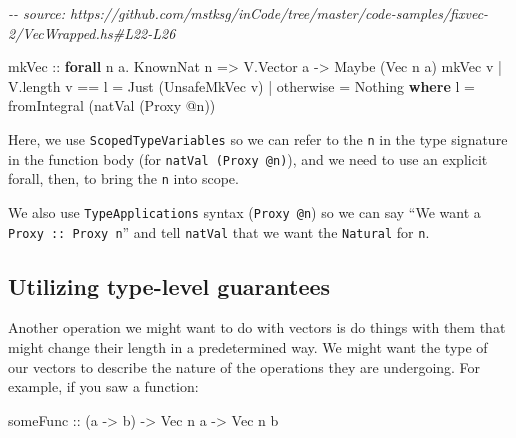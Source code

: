 \documentclass[]{article}
\newenvironment{Shaded}{}{}
\newcommand{\CommentTok}[1]{\textcolor[rgb]{0.38,0.63,0.69}{\textit{#1}}}
\newcommand{\DataTypeTok}[1]{\textcolor[rgb]{0.56,0.13,0.00}{#1}}
\newcommand{\FunctionTok}[1]{\textcolor[rgb]{0.02,0.16,0.49}{#1}}
\newcommand{\KeywordTok}[1]{\textcolor[rgb]{0.00,0.44,0.13}{\textbf{#1}}}
\newcommand{\NormalTok}[1]{#1}
\newcommand{\OperatorTok}[1]{\textcolor[rgb]{0.40,0.40,0.40}{#1}}
\newcommand{\OtherTok}[1]{\textcolor[rgb]{0.00,0.44,0.13}{#1}}
\begin{document}
\begin{Shaded}
\begin{Highlighting}[]
\CommentTok{{-}{-} source: https://github.com/mstksg/inCode/tree/master/code{-}samples/fixvec{-}2/VecWrapped.hs\#L22{-}L26}

\OtherTok{mkVec ::} \KeywordTok{forall}\NormalTok{ n a}\OperatorTok{.} \DataTypeTok{KnownNat}\NormalTok{ n }\OtherTok{=\textgreater{}} \DataTypeTok{V.Vector}\NormalTok{ a }\OtherTok{{-}\textgreater{}} \DataTypeTok{Maybe}\NormalTok{ (}\DataTypeTok{Vec}\NormalTok{ n a)}
\NormalTok{mkVec v }\OperatorTok{|}\NormalTok{ V.length v }\OperatorTok{==}\NormalTok{ l }\OtherTok{=} \DataTypeTok{Just}\NormalTok{ (}\DataTypeTok{UnsafeMkVec}\NormalTok{ v)}
        \OperatorTok{|} \FunctionTok{otherwise}       \OtherTok{=} \DataTypeTok{Nothing}
  \KeywordTok{where}
\NormalTok{    l }\OtherTok{=} \FunctionTok{fromIntegral}\NormalTok{ (natVal (}\DataTypeTok{Proxy} \OperatorTok{@}\NormalTok{n))}
\end{Highlighting}
\end{Shaded}

Here, we use \texttt{ScopedTypeVariables} so we can refer to the \texttt{n} in
the type signature in the function body (for \texttt{natVal\ (Proxy\ @n)}), and
we need to use an explicit forall, then, to bring the \texttt{n} into scope.

We also use \texttt{TypeApplications} syntax (\texttt{Proxy\ @n}) so we can say
``We want a \texttt{Proxy\ ::\ Proxy\ n}'' and tell \texttt{natVal} that we want
the \texttt{Natural} for \texttt{n}.

\subsection{Utilizing type-level
guarantees}\label{utilizing-type-level-guarantees}

Another operation we might want to do with vectors is do things with them that
might change their length in a predetermined way. We might want the type of our
vectors to describe the nature of the operations they are undergoing. For
example, if you saw a function:

\begin{Shaded}
\begin{Highlighting}[]
\OtherTok{someFunc ::}\NormalTok{ (a }\OtherTok{{-}\textgreater{}}\NormalTok{ b) }\OtherTok{{-}\textgreater{}} \DataTypeTok{Vec}\NormalTok{ n a }\OtherTok{{-}\textgreater{}} \DataTypeTok{Vec}\NormalTok{ n b}
\end{Highlighting}
\end{Shaded}
\end{document}

